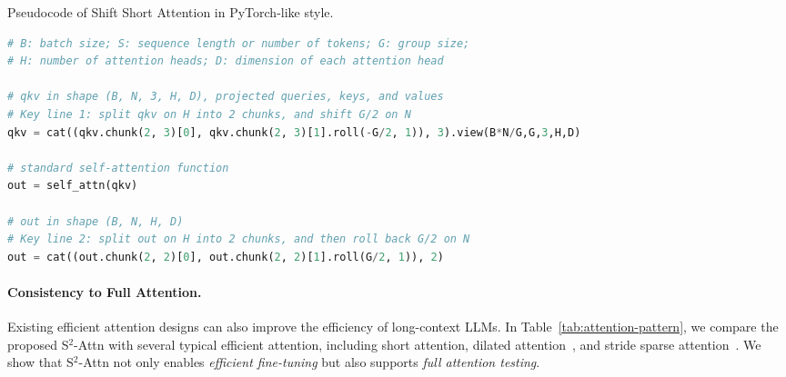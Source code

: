 \documentclass{article} %
\makeatletter
\let\@algcomment\relax
\newcommand\algcomment[1]{\def\@algcomment{\footnotesize#1}}
\makeatother
\begin{document}
\begin{algorithm}[t]
\caption{Pseudocode of Shift Short Attention in PyTorch-like style.}
\label{algo:code}
\algcomment{\fontsize{7.2pt}{0em}\selectfont \texttt{cat}: concatenation; \texttt{chunk}: split into the specified number of chunks; \texttt{roll}: roll the tensor along the given dimension.
}
\begin{lstlisting}[language=python]
# B: batch size; S: sequence length or number of tokens; G: group size;
# H: number of attention heads; D: dimension of each attention head

# qkv in shape (B, N, 3, H, D), projected queries, keys, and values
# Key line 1: split qkv on H into 2 chunks, and shift G/2 on N
qkv = cat((qkv.chunk(2, 3)[0], qkv.chunk(2, 3)[1].roll(-G/2, 1)), 3).view(B*N/G,G,3,H,D)

# standard self-attention function
out = self_attn(qkv)

# out in shape (B, N, H, D)
# Key line 2: split out on H into 2 chunks, and then roll back G/2 on N
out = cat((out.chunk(2, 2)[0], out.chunk(2, 2)[1].roll(G/2, 1)), 2)
\end{lstlisting}
\end{algorithm}

\paragraph{Consistency to Full Attention.}
Existing efficient attention designs can also improve the efficiency of long-context LLMs.
In Table~\ref{tab:attention-pattern}, we compare the proposed S$^2$-Attn with several typical efficient attention, including short attention, dilated attention~\citep{longnet},
and stride sparse attention~\citep{sparse-transformer}. We show that S$^2$-Attn not only enables {\em efficient fine-tuning} but also supports {\em full attention testing}.
\end{document}
